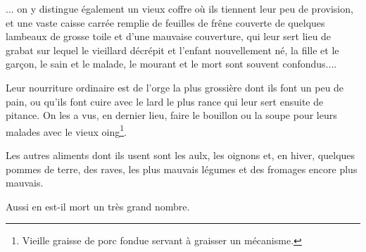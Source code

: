 {\medskip
... on y distingue également un vieux coffre où ils tiennent leur peu de provision, et une vaste caisse carrée remplie de feuilles de frêne couverte de quelques lambeaux de grosse toile et d’une mauvaise couverture, qui leur sert lieu de grabat sur lequel le vieillard décrépit et l’enfant nouvellement né, la fille et le garçon, le sain et le malade, le mourant et le mort sont souvent confondus....

\medskip
Leur nourriture ordinaire est de l’orge la plus grossière dont ils font un peu de pain, ou qu’ils font cuire avec le lard le plus rance qui leur sert ensuite de pitance. On les a vus, en dernier lieu, faire le bouillon ou la soupe pour leurs malades avec le vieux oing\footnote{Vieille graisse de porc fondue servant à graisser un mécanisme.}.

Les autres aliments dont ils usent sont les aulx, les oignons et, en hiver, quelques pommes de terre, des raves, les plus mauvais légumes et des fromages encore plus mauvais.

Aussi en est-il mort un très grand nombre.

}

